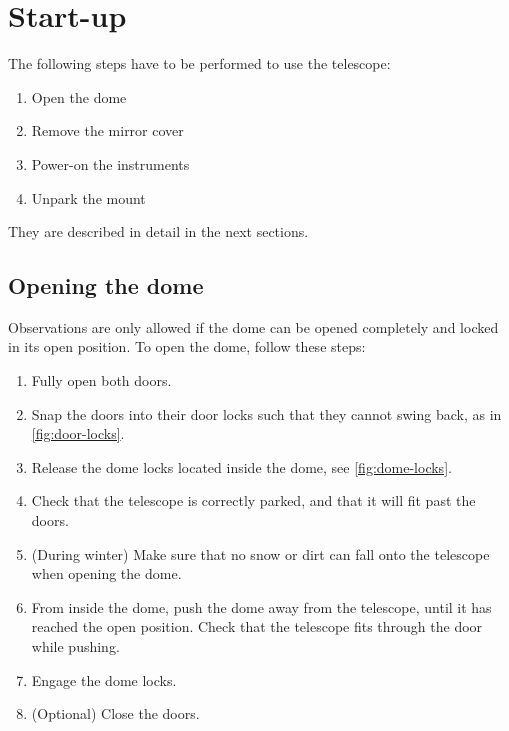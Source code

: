 \documentclass[a4paper, 11pt, fleqn]{memoir}
\begin{document}
\clearpage

\section{Start-up} The following steps have to be performed to use the telescope:
\begin{enumerate}
    \item Open the dome
    \item Remove the mirror cover
    \item Power-on the instruments
    \item Unpark the mount
\end{enumerate}
They are described in detail in the next sections.

\subsection{Opening the dome}

Observations are only allowed if the dome can be opened completely and locked in its open position.
To open the dome, follow these steps:
\begin{enumerate}
    \item Fully open both doors.
    \item Snap the doors into their door locks such that they cannot swing back, as in \cref{fig:door-locks}.
    \item Release the dome locks located inside the dome, see \cref{fig:dome-locks}.
    \item Check that the telescope is correctly parked, and that it will fit past the doors.
    \item (During winter) Make sure that no snow or dirt can fall onto the telescope when opening the dome.
    \item From inside the dome, push the dome away from the telescope, until it has reached the open position.
          Check that the telescope fits through the door while pushing.
    \item Engage the dome locks.
    \item (Optional) Close the doors.
\end{enumerate}
\end{document}
